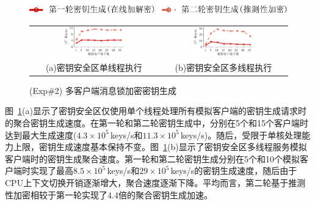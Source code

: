 \begin{figure}[!htb]
    \small
    \centering
    \includegraphics[height=11pt]{pic/sgxdedup/plot/exp_a3/expa3_keyScale_performance_legend.pdf}
    \begin{tabular}{@{\ }c@{\ }c}
        \includegraphics[width=0.49\textwidth]{pic/sgxdedup/plot/exp_a3/expa3_keyScale_performance_number_singleThread.pdf} & 
        \hspace{5pt}
        \includegraphics[width=0.49\textwidth]{pic/sgxdedup/plot/exp_a3/expa3_keyScale_performance_number_multiThread.pdf}     \\
        \mbox{\small (a)密钥安全区单线程执行}                                                                               & 
        \mbox{\small (b)密钥安全区多线程执行}                                                                                  \\
    \end{tabular}
    \caption{(Exp\#2) 多客户端消息锁加密密钥生成}
    \label{fig:sgxdedup-exp-keygen-scalability}
\end{figure}

图~\ref{fig:sgxdedup-exp-keygen-scalability}(a)显示了密钥安全区仅使用单个线程处理所有模拟客户端的密钥生成请求时的聚合密钥生成速度。在第一轮和第二轮密钥生成中，\sysnameS 分别在5个和15个客户端时达到最大生成速度($4.3\times 10^5$\,keys/s和$11.3\times 10^5$\,keys/s)。随后，受限于单核处理能力上限，密钥生成速度基本保持不变。图~\ref{fig:sgxdedup-exp-keygen-scalability}(b)显示了密钥安全区多线程服务模拟客户端时的密钥生成聚合速度。第一轮和第二轮密钥生成分别在5个和10个模拟客户端时实现了最高$8.5\times 10^5$\,keys/s和$29\times 10^5$\,keys/s的密钥生成速度，随后由于CPU上下文切换开销逐渐增大，聚合速度逐渐下降。平均而言，第二轮基于推测性加密相较于第一轮实现了4.4倍的聚合密钥生成加速。

